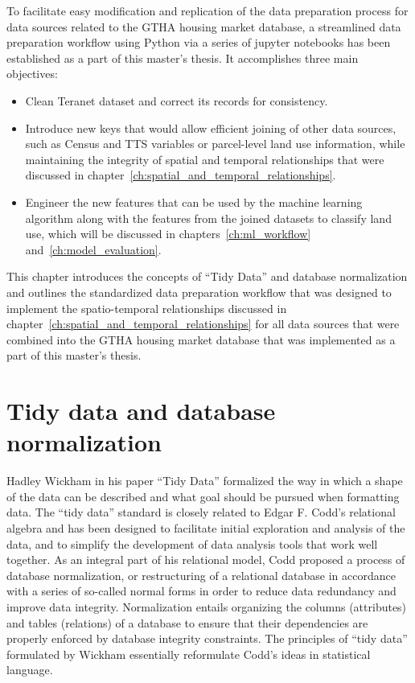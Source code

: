 To facilitate easy modification and replication of the data preparation process for data sources related to the GTHA housing market database, a streamlined data preparation workflow using Python via a series of jupyter notebooks has been established as a part of this master's thesis.
It accomplishes three main objectives:
\begin{itemize}
    \item Clean Teranet dataset and correct its records for consistency.
    \item Introduce new keys that would allow efficient joining of other data sources, such as Census and TTS variables or parcel-level land use information, while maintaining the integrity of spatial and temporal relationships that were discussed in chapter~\ref{ch:spatial_and_temporal_relationships}.
    \item Engineer the new features that can be used by the machine learning algorithm along with the features from the joined datasets to classify land use, which will be discussed in chapters~\ref{ch:ml_workflow} and~\ref{ch:model_evaluation}.
\end{itemize}

This chapter introduces the concepts of ``Tidy Data'' and database normalization and outlines the standardized data preparation workflow that was designed to implement the spatio-temporal relationships discussed in chapter~\ref{ch:spatial_and_temporal_relationships} for all data sources that were combined into the GTHA housing market database that was implemented as a part of this master's thesis.

\section{Tidy data and database normalization} \label{sec:db_norm_tidy_data}

Hadley Wickham in his paper ``Tidy Data''\cite{Wickham2014} formalized the way in which a shape of the data can be described and what goal should be pursued when formatting data.
The ``tidy data'' standard is closely related to Edgar F. Codd's relational algebra and has been designed to facilitate initial exploration and analysis of the data, and to simplify the development of data analysis tools that work well together.
As an integral part of his relational model, Codd\cite{Codd1990} proposed a process of database normalization, or restructuring of a relational database in accordance with a series of so-called normal forms in order to reduce data redundancy and improve data integrity.
Normalization entails organizing the columns (attributes) and tables (relations) of a database to ensure that their dependencies are properly enforced by database integrity constraints.
The principles of ``tidy data'' formulated by Wickham essentially reformulate Codd's ideas in statistical language.

